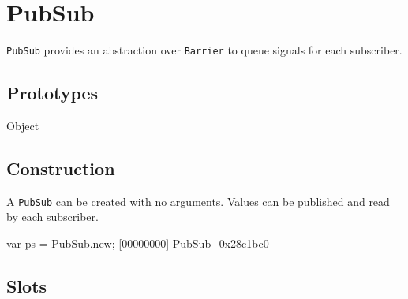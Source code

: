 
\section{PubSub}

\lstinline|PubSub| provides an abstraction over \lstinline|Barrier|
 to queue signals for each subscriber.

\subsection{Prototypes}

\begin{refObjects}
\item[Object]
\end{refObjects}

\subsection{Construction}

A \lstinline|PubSub| can be created with no arguments.  Values can be
published and read by each subscriber.

\begin{urbiscript}[firstnumber=1]
var ps = PubSub.new;
[00000000] PubSub_0x28c1bc0
\end{urbiscript}

\subsection{Slots}

